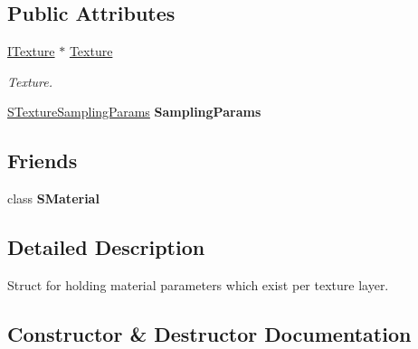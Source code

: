 \subsection*{Public Attributes}
\begin{DoxyCompactItemize}
\item 
\hyperlink{classirr_1_1video_1_1ITexture}{I\+Texture} $\ast$ \hyperlink{classirr_1_1video_1_1SMaterialLayer_aee7162444c5ed350375c7a46e1bbe450}{Texture}\hypertarget{classirr_1_1video_1_1SMaterialLayer_aee7162444c5ed350375c7a46e1bbe450}{}\label{classirr_1_1video_1_1SMaterialLayer_aee7162444c5ed350375c7a46e1bbe450}

\begin{DoxyCompactList}\small\item\em Texture. \end{DoxyCompactList}\item 
\hyperlink{classirr_1_1video_1_1STextureSamplingParams}{S\+Texture\+Sampling\+Params} {\bfseries Sampling\+Params}\hypertarget{classirr_1_1video_1_1SMaterialLayer_a8a0af5761141a0978aa26a76a660a0fb}{}\label{classirr_1_1video_1_1SMaterialLayer_a8a0af5761141a0978aa26a76a660a0fb}

\end{DoxyCompactItemize}
\subsection*{Friends}
\begin{DoxyCompactItemize}
\item 
class {\bfseries S\+Material}\hypertarget{classirr_1_1video_1_1SMaterialLayer_a178a261c0a0cf47aa84fb7e9345f6d6f}{}\label{classirr_1_1video_1_1SMaterialLayer_a178a261c0a0cf47aa84fb7e9345f6d6f}

\end{DoxyCompactItemize}


\subsection{Detailed Description}
Struct for holding material parameters which exist per texture layer. 

\subsection{Constructor \& Destructor Documentation}

